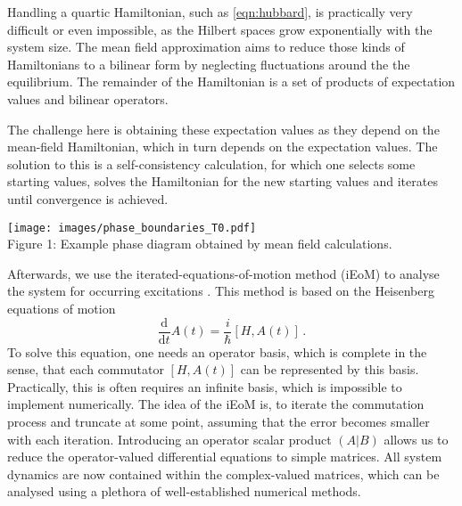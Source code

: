 \documentclass[20pt]{article}
\newcommand{\mcaption}[2]{ \\ Figure {#1}: {#2} } %
\newcommand{\timeDeriv}{\frac{\mathrm{d}}{\mathrm{d}t}}
\begin{document}
\begin{minipage}{0.40\textwidth}
    Handling a quartic Hamiltonian, such as \autoref{eqn:hubbard}, is practically very difficult or even impossible,
    as the Hilbert spaces grow exponentially with the system size.
    The mean field approximation aims to reduce those kinds of Hamiltonians to a bilinear form by neglecting fluctuations around the the equilibrium.
    The remainder of the Hamiltonian is a set of products of expectation values and bilinear operators.

    The challenge here is obtaining these expectation values as they depend on the mean-field Hamiltonian, which in turn depends on the expectation values.
    The solution to this is a self-consistency calculation, for which one selects some starting values,
    solves the Hamiltonian for the new starting values and iterates until convergence is achieved.
\end{minipage}
\hspace{0.01\textwidth}
\begin{minipage}{0.58\textwidth}
    \begin{center}
        \texttt{[image: images/phase\_boundaries\_T0.pdf]}
        \mcaption{1}{Example phase diagram obtained by mean field calculations.}
    \end{center}
\end{minipage}
\vspace{10pt}

Afterwards, we use the iterated-equations-of-motion method (iEoM) to analyse the system for occurring excitations \cite{philip18, Kalthoff2017}.
This method is based on the Heisenberg equations of motion 
\begin{equation}
    \timeDeriv A(t) = \frac{i}{\hbar} [H, A(t)]\,.
\end{equation}
To solve this equation, one needs an operator basis, which is complete in the sense, that each commutator $[H, A(t)]$ can be represented by this basis.
Practically, this is often requires an infinite basis, which is impossible to implement numerically.
The idea of the iEoM is, to iterate the commutation process and truncate at some point, assuming that the error becomes smaller with each iteration.
Introducing an operator scalar product $(A | B)$ allows us to reduce the operator-valued differential equations to simple matrices.
All system dynamics are now contained within the complex-valued matrices, which can be analysed using a plethora of well-established numerical methods.
\end{document}

